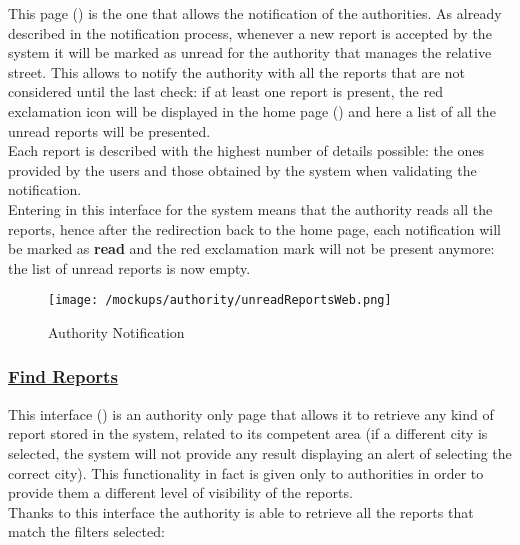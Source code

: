 				This page () is the one that allows the notification of the authorities. As already described in the notification process, whenever a new report is accepted by the system it will be marked as unread for the authority that manages the relative street. This allows to notify the authority with all the reports that are not considered until the last check: if at least one report is present, the red exclamation icon will be displayed in the home page () and here a list of all the unread reports will be presented.\\
				
				Each report is described with the highest number of details possible: the ones provided by the users and those obtained by the system when validating the notification. \\
				
				Entering in this interface for the system means that the authority reads all the reports, hence after the redirection back to the home page, each notification will be marked as \textbf{read} and the red exclamation mark will not be present anymore: the list of unread reports is now empty.
				
				\newpage
				
				\begin{figure}[ht!]
					\centering
					\texttt{[image: /mockups/authority/unreadReportsWeb.png]}
					\caption{\label{fig:unreadReports} Authority Notification}
				\end{figure}
			
			\subsubsection[Find Reports]{\hyperlink{toc}{Find Reports}}
				\label{sec:authorityFindReports}
				
				This interface () is an authority only page that allows it to retrieve any kind of report stored in the system, related to its competent area (if a different city is selected, the system will not provide any result displaying an alert of selecting the correct city). This functionality in fact is given only to authorities in order to provide them a different level of visibility of the reports.\\
				
				Thanks to this interface the authority is able to retrieve all the reports that match the filters selected:
				
